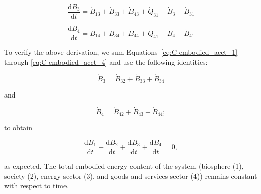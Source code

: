 \begin{equation} \label{eq:C-embodied_acct_3}
	\frac{\mathrm{d}B_{3}}{\mathrm{d}t} 	 
	= \dot{B}_{13} 
	+ \dot{B}_{33} 
	+ \dot{B}_{43} 
	+ \dot{Q}_{31} 
	- \dot{B}_{3} 
	- \dot{B}_{31}
\end{equation}

\begin{equation} \label{eq:C-embodied_acct_4}
	\frac{\mathrm{d}B_{4}}{\mathrm{d}t}	 
	= \dot{B}_{14} 
	+ \dot{B}_{34} 
	+ \dot{B}_{44} 
	+ \dot{Q}_{41} 
	- \dot{B}_{4} 
	- \dot{B}_{41}
\end{equation}

To verify the above derivation, 
we sum Equations~\ref{eq:C-embodied_acct_1} through 
\ref{eq:C-embodied_acct_4} 
and use the following identities:

\begin{equation} \label{eq:C-B_sum_3_output}
	\dot{B}_3 
	= \dot{B}_{32} 
	+ \dot{B}_{33} 
	+ \dot{B}_{34}
\end{equation}

\noindent and

\begin{equation} \label{eq:C-B_sum_4_output}
	\dot{B}_4 
	= \dot{B}_{42} 
	+ \dot{B}_{43} 
	+ \dot{B}_{44};
\end{equation}

\noindent to obtain

\begin{equation} \label{eq:C-B_sums_to_zero}
	\frac{\mathrm{d}B_{1}}{\mathrm{d}t} 
	+ \frac{\mathrm{d}B_{2}}{\mathrm{d}t} 
	+ \frac{\mathrm{d}B_{3}}{\mathrm{d}t} 
	+ \frac{\mathrm{d}B_{4}}{\mathrm{d}t} 
	= 0,
\end{equation}

\noindent as expected. The total embodied energy content of the system 
(biosphere (1), society (2), energy sector (3), and goods and services sector (4)) 
remains constant with respect to time.








